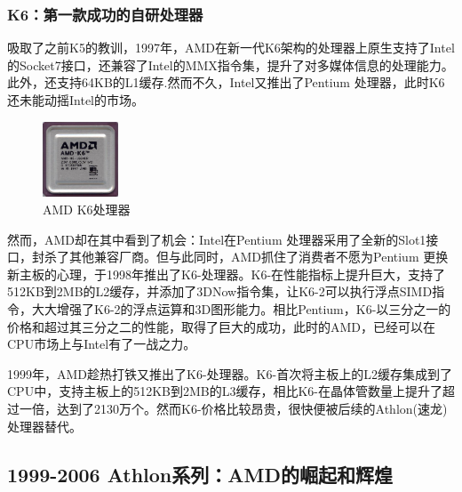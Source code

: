 \documentclass[UTF8]{ctexart}
\begin{document}
\subsubsection{K6：第一款成功的自研处理器}
吸取了之前K5的教训，1997年，AMD在新一代K6架构的处理器上原生支持了Intel的Socket7接口，还兼容了Intel的MMX指令集，提升了对多媒体信息的处理能力。此外，还支持64KB的L1缓存.然而不久，Intel又推出了Pentium \uppercase\expandafter{}处理器，此时K6还未能动摇Intel的市场。
\begin{figure}[H]
    \begin{center}
        \includegraphics[width=0.2\textwidth]{figure/K6.jpg}
        \caption{AMD K6处理器}
    \end{center}
\end{figure}
然而，AMD却在其中看到了机会：Intel在Pentium \uppercase\expandafter{}处理器采用了全新的Slot1接口，封杀了其他兼容厂商。但与此同时，AMD抓住了消费者不愿为Pentium \uppercase\expandafter{}更换新主板的心理，于1998年推出了K6-\uppercase\expandafter{}处理器。K6-\uppercase\expandafter{}在性能指标上提升巨大，支持了512KB到2MB的L2缓存，并添加了3DNow指令集，让K6-2可以执行浮点SIMD指令，大大增强了K6-2的浮点运算和3D图形能力。相比Pentium\uppercase\expandafter{}，K6-\uppercase\expandafter{}以三分之一的价格和超过其三分之二的性能，取得了巨大的成功，此时的AMD，已经可以在CPU市场上与Intel有了一战之力。

1999年，AMD趁热打铁又推出了K6-\uppercase\expandafter{}处理器。K6-\uppercase\expandafter{}首次将主板上的L2缓存集成到了CPU中，支持主板上的512KB到2MB的L3缓存，相比K6-\uppercase\expandafter{}在晶体管数量上提升了超过一倍，达到了2130万个。然而K6-\uppercase\expandafter{}价格比较昂贵，很快便被后续的Athlon(速龙)处理器替代。


\subsection{1999-2006 Athlon系列：AMD的崛起和辉煌}
\end{document}
